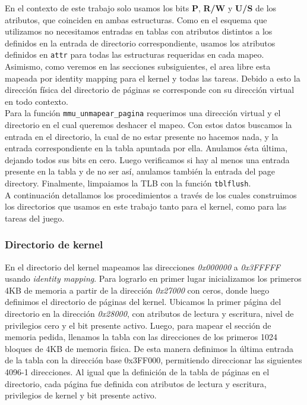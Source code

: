 En el contexto de este trabajo solo usamos los bits \textbf{P}, \textbf{R/W} y \textbf{U/S} de los atributos, que coinciden en ambas estructuras. 
Como en el esquema que utilizamos no necesitamos entradas en tablas con atributos distintos a los definidos en la entrada de directorio correspondiente, usamos los atributos definidos en \verb|attr| para todas las estructuras requeridas en cada mapeo.
Asimismo, como veremos en las secciones subsiguientes, el area libre esta mapeada por identity mapping para el kernel y todas las tareas. Debido a esto la dirección física del directorio de páginas se corresponde con su dirección virtual en todo contexto.\\

Para la función \verb|mmu_unmapear_pagina| requerimos una dirección virtual y el directorio en el cual queremos deshacer el mapeo. 
Con estos datos buscamos la entrada en el directorio, la cual de no estar presente no hacemos nada, y la entrada correspondiente en la tabla apuntada por ella.
Anulamos ésta última, dejando todos sus bits en cero. 
Luego verificamos si hay al menos una entrada presente en la tabla y de no ser así, anulamos también la entrada del page directory.
Finalmente, limpaiamos la TLB con la función \verb|tblflush|.\\

A continuación detallamos los procedimientos a través de los cuales construimos los directorios que usamos en este trabajo tanto para el kernel, como para las tareas del juego.


\subsubsection{Directorio de kernel}

En el directorio del kernel mapeamos las direcciones \textit{0x000000} a \textit{0x3FFFFF} usando \textit{identity mapping}.
Para lograrlo en primer lugar inicializamos los primeros 4KB de memoria a partir de la dirección \textit{0x27000} con ceros, donde luego definimos el directorio de páginas del kernel.
Ubicamos la primer página del directorio en la dirección \textit{0x28000}, con atributos de lectura y escritura, nivel de privilegios cero y el bit presente activo.
Luego, para mapear el sección de memoria pedida, llenamos la tabla con las direcciones de los primeros 1024 bloques de 4KB de memoria física. 
De esta manera definimos la última entrada de la tabla con la dirección base 0x3FF000, permitiendo direccionar las siguientes 4096-1 direcciones. 
Al igual que la definición de la tabla de páginas en el directorio, cada página fue definida con atributos de lectura y escritura, privilegios de kernel y bit presente activo.

